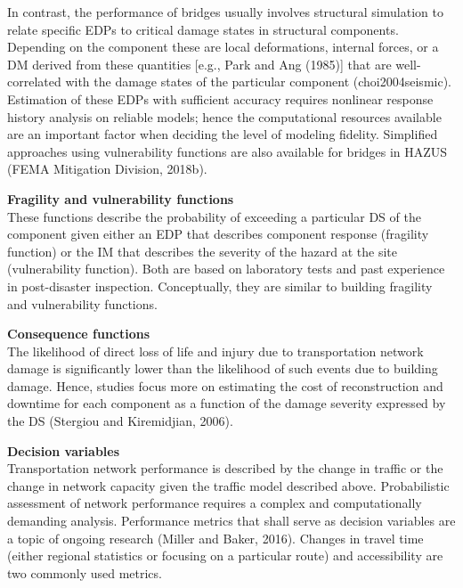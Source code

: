 In contrast, the performance of bridges usually involves structural simulation to relate specific EDPs to critical damage states in structural components. Depending on the component these are local deformations, internal forces, or a DM derived from these quantities [e.g., Park and Ang (1985)] that are well-correlated with the damage states of the particular component (choi2004seismic). Estimation of these EDPs with sufficient accuracy requires nonlinear response history analysis on reliable models; hence the computational resources available are an important factor when deciding the level of modeling fidelity. Simplified approaches using vulnerability functions are also available for bridges in HAZUS (FEMA Mitigation Division, 2018b).
\newline

\noindent\textbf{Fragility and vulnerability functions} \\These functions describe the probability of exceeding a particular DS of the component given either an EDP that describes component response (fragility function) or the IM that describes the severity of the hazard at the site (vulnerability function). Both are based on laboratory tests and past experience in post-disaster inspection. Conceptually, they are similar to building fragility and vulnerability functions.
\newline

\noindent\textbf{Consequence functions} \\The likelihood of direct loss of life and injury due to transportation network damage is significantly lower than the likelihood of such events due to building damage. Hence, studies focus more on estimating the cost of reconstruction and downtime for each component as a function of the damage severity expressed by the DS (Stergiou and Kiremidjian, 2006). 
\newline

\noindent\textbf{Decision variables} \\Transportation network performance is described by the change in traffic or the change in network capacity given the traffic model described above. Probabilistic assessment of network performance requires a complex and computationally demanding analysis. Performance metrics that shall serve as decision variables are a topic of ongoing research (Miller and Baker, 2016). Changes in travel time (either regional statistics or focusing on a particular route) and accessibility are two commonly used metrics.

